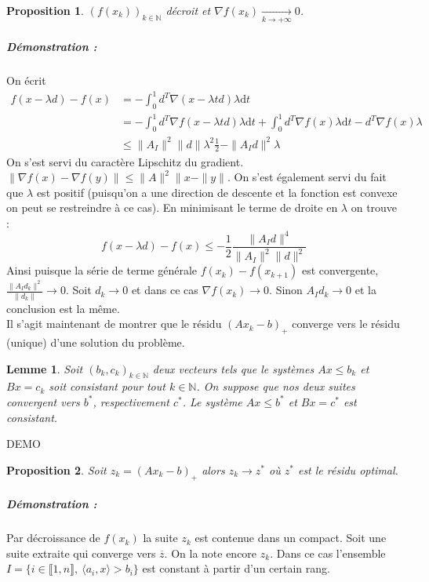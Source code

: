 \documentclass[10pt,a4paper]{article}
\newtheorem{prop}{Proposition}
\newtheorem{lemma}{Lemme}
\begin{document}
\begin{prop} $(f(x_k))_{k \in \mathbb{N}}$ décroit et $\nabla f(x_k) \underset{k \rightarrow +\infty}{\rightarrow} 0$.
\end{prop}
\subparagraph{Démonstration :}
On écrit
\begin{equation}
\begin{aligned}
f(x-\lambda d)-f(x)&=-\int_0^1  d^T\nabla(x -\lambda  t d) \lambda \text{d}t \\
&=-\int_0^1  d^T\nabla f(x -\lambda t d) \lambda \text{d}t + \int_0^1  d^T\nabla f(x) \lambda \text{d}t - d^T\nabla f(x) \lambda\\
&\le \|A_I\|^2 \| d \| \lambda^2 \frac{1}{2} - \| A_I d \|^2 \lambda
\end{aligned}
\end{equation}
On s'est servi du caractère Lipschitz du gradient. $\| \nabla f(x) -\nabla f(y) \| \le \|A \|^2 \| x - \| y \|$.
On s'est également servi du fait que $\lambda$ est positif (puisqu'on a une direction de descente et la fonction est convexe on peut se restreindre à ce cas).
En minimisant le terme de droite en $\lambda$ on trouve :
\begin{equation}
f(x-\lambda d)-f(x) \le -\frac{1}{2}\frac{\| A_I d \|^4}{\|A_I \|^2 \|d \|^2}
\end{equation}
Ainsi puisque la série de terme générale $f(x_k)-f(x_{k+1})$ est convergente, $\frac{\| A_I d_k \|^2}{ \|d_k \|} \rightarrow 0$.
Soit $d_k \rightarrow 0$ et dans ce cas $\nabla f (x_k) \rightarrow 0$.
Sinon $A_I d_k \rightarrow 0$ et la conclusion est la même.\\
Il s'agit maintenant de montrer que le résidu $(Ax_k-b)_+$ converge vers le résidu (unique) d'une solution du problème.
\begin{lemma}
Soit $(b_k,c_k)_{k \in \mathbb{N}}$ deux vecteurs tels que le systèmes $Ax\le b_k$ et $Bx=c_k$ soit consistant pour tout $k \in \mathbb{N}$.
On suppose que nos deux suites convergent vers $b^*$, respectivement $c^*$.
Le système $Ax \le b^*$ et $Bx=c^*$ est consistant.
\end{lemma}
DEMO
\begin{prop}
Soit $z_k=(Ax_k-b)_+$ alors $z_k \rightarrow z^*$ où $z^*$ est le résidu optimal.
\end{prop}
\subparagraph{Démonstration :} Par décroissance de $f(x_k)$ la suite $z_k$ est contenue dans un compact.
Soit une suite extraite qui converge vers $\overline{z}$.
On la note encore $z_k$.
Dans ce cas l'ensemble $I= \lbrace i \in \llbracket 1,n \rrbracket, \ \langle a_i,x \rangle > b_i \rbrace$ est constant à partir d'un certain rang.
\end{document}

